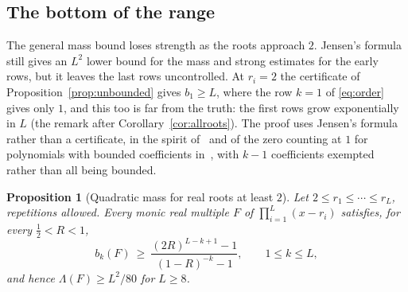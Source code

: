 \documentclass[11pt]{article}
\newtheorem{proposition}[theorem]{Proposition}
\begin{document}
\subsection{The bottom of the range}\label{sec:bottom}

The general mass bound loses strength as the roots approach $2$.  Jensen's
formula still gives an $L^2$ lower bound for the mass and strong estimates
for the early rows, but it leaves the last rows uncontrolled.  At
$r_i=2$ the certificate of Proposition~\ref{prop:unbounded} gives
$b_1\ge L$, where the row $k=1$ of \eqref{eq:order} gives only $1$, and
this too is far from the truth: the first rows grow exponentially in $L$
(the remark after Corollary~\ref{cor:allroots}).  The proof uses
Jensen's formula rather than a certificate, in the spirit
of~\cite{bbbp-multiple,bbbp-ray} and of the zero counting at $1$ for
polynomials with bounded coefficients in~\cite{bek}, with $k-1$ coefficients exempted rather
than all being bounded.

\begin{proposition}[Quadratic mass for real roots at least $2$]
\label{prop:quadratic}
Let $2\le r_1\le\cdots\le r_L$, repetitions allowed.  Every monic real
multiple $F$ of $\prod_{i=1}^L(x-r_i)$ satisfies, for every
$\tfrac12<R<1$,
\begin{equation}\label{eq:jensen}
  b_k(F)\ \ge\ \frac{(2R)^{L-k+1}-1}{(1-R)^{-k}-1},\qquad 1\le k\le L,
\end{equation}
and hence $\Lambda(F)\ge L^2/80$ for $L\ge8$.
\end{proposition}
\end{document}
